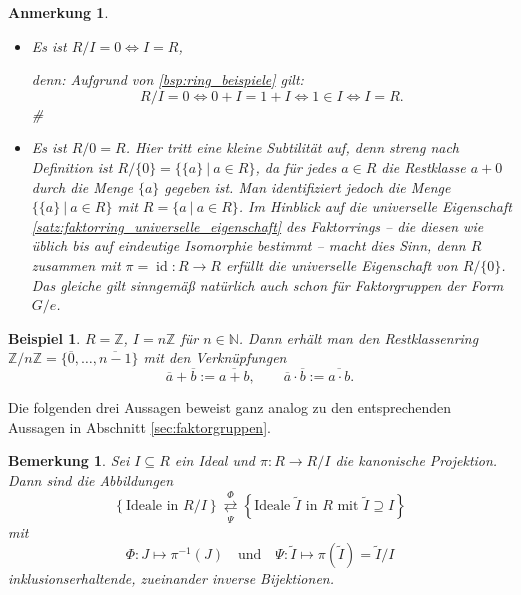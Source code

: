 \documentclass[a4paper, twoside, 11pt, ngerman]{report}
\newcommand{\NN}{\mathds N}
\newcommand{\ZZ}{\mathds Z}
\DeclareMathOperator{\ident}{id}
\theoremstyle{definistyle}
\newtheorem{bem}[satz]{Bemerkung}
\newtheorem{anm}[satz]{Anmerkung}
\newtheorem{bsp}[satz]{Beispiel}
\theoremstyle{remark}
\newenvironment{denn}%
  {\par\textit{denn:}}%
  {\hfill\#\par}
\begin{document}
\begin{anm}\label{anm:nullring}
\begin{itemize}
    \item Es ist $R / I = 0 \iff I = R$, 
\begin{denn}
Aufgrund von \ref{bsp:ring_beispiele} gilt: \[R / I = 0 \iff 0 + I = 1 + I \iff 1 \in I \iff I = R.\]
\end{denn}
\item Es ist $R/{0}=R$. Hier tritt eine kleine Subtilität auf, denn streng nach Definition ist
$R/\{0\}=\{\{a\} \ | \ a\in R\}$, da für jedes $a\in R$ die Restklasse $a+{0}$ durch die Menge $\{a\}$
gegeben ist. Man identifiziert jedoch die Menge $\{\{a\} \ | \ a\in R\}$ mit $R=\{a\ | \ a\in R\}$.
Im Hinblick auf die universelle Eigenschaft \ref{satz:faktorring_universelle_eigenschaft} des Faktorrings -- die diesen wie üblich bis auf eindeutige Isomorphie bestimmt -- macht dies Sinn,
denn $R$ zusammen mit $\pi=\ident\colon R\to R$ erfüllt die universelle Eigenschaft von $R/\{0\}$.
Das gleiche gilt sinngemäß natürlich auch schon für Faktorgruppen der Form $G/e$.
\end{itemize}
\end{anm}

\begin{bsp}\label{bsp:restklassenringe}
$R = \ZZ$, $I = n \ZZ$ für $n \in \NN$. Dann erhält man den Restklassenring $\ZZ / n \ZZ = \{ \overline{0}, \ldots, \overline{n-1} \}$ mit den Verknüpfungen \[\overline{a} + \overline{b} := \overline{a + b}, \qquad \overline{a} \cdot
\overline{b} := \overline{a \cdot b}.\]
\end{bsp}

Die folgenden drei Aussagen beweist ganz analog zu den entsprechenden Aussagen in Abschnitt
\ref{sec:faktorgruppen}.

\begin{bem}\label{bem:ideale_faktorringe}
Sei $I \subseteq R$ ein Ideal und $\pi \colon R \to R / I$ die kanonische Projektion. Dann sind die Abbildungen
\[
\left\{ \text{Ideale in } R / I \right\} \overset{\Phi}{\underset{\Psi}{\rightleftarrows}} \left\{ \text{Ideale } \tilde{I} \text{ in } R \text{ mit } \tilde{I} \supseteq I \right\}
\]
mit
\[
\Phi \colon J \mapsto \pi^{-1}(J) \quad \text{und} \quad \Psi \colon \tilde{I} \mapsto \pi(\tilde{I})=\tilde I/I
\]
inklusionserhaltende, zueinander inverse Bijektionen.
\end{bem}
\end{document}
